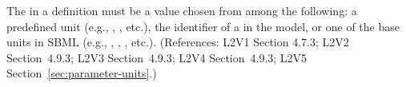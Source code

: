 The  in a \Parameter definition must be a value chosen from
among the following: a predefined unit (e.g., , ,
etc.), the identifier of a \UnitDefinition in the model, or one of the
base units in SBML (e.g., , , ,
etc.).  (References: L2V1 Section 4.7.3; L2V2 Section~4.9.3; L2V3
Section~4.9.3; L2V4 Section~4.9.3; L2V5 Section~\ref{sec:parameter-units}.)
